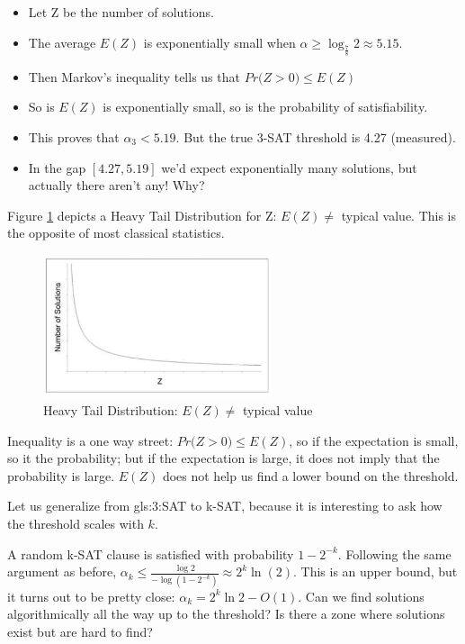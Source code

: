 \documentclass[]{article}
\begin{document}
\begin{itemize}
	\item Let Z be the number of solutions.
	\item The average $E(Z)$ is exponentially small when  $\alpha \ge \log_{\frac{7}{8}}2\approx5.15$.
	\item Then Markov's inequality\cite{wiki:markov:inequality} tells us that $Pr\big(Z>0\big) \le E(Z)$ 
	\item So is $E(Z)$ is exponentially small, so is the probability of satisfiability.
	\item This proves that $\alpha_3<5.19$. But the true 3-SAT threshold is 4.27 (measured).
	\item In the gap $[4.27,5.19]$ we'd expect exponentially many solutions, but actually there aren't any! Why?
\end{itemize}

Figure \ref{fig:heavy-tail} depicts a Heavy Tail Distribution for Z: $E(Z)\ne$ typical value. This is the opposite of most classical statistics.
\begin{figure}[H]
	\begin{center}
		\caption{Heavy Tail Distribution: $E(Z)\ne$ typical value}\label{fig:heavy-tail}
		\includegraphics[width=0.6\textwidth]{heavy-tail}
	\end{center}
\end{figure}

Inequality is a one way street: $Pr\big(Z>0\big) \le E(Z)$, so if the expectation is small, so it the probability; but if the expectation is large, it does not imply that the probability is large. $E(Z)$ does not help us find a lower bound on the threshold.

Let us generalize from \gls{gls:3:SAT} to k-SAT, because it is interesting to ask how the threshold scales with $k$.

A random k-SAT clause is satisfied with probability $1-2^{-k}$. Following the same argument as before, $\alpha_k\le\frac{\log 2}{-\log (1-2^{-k})} \approx 2^k \ln(2)$. This is an upper bound, but it turns out to be pretty close: $\alpha_k=2^k \ln 2-O(1)$. Can we find solutions algorithmically all the way up to the threshold? Is there a zone where solutions exist but are hard to find?
\end{document}
